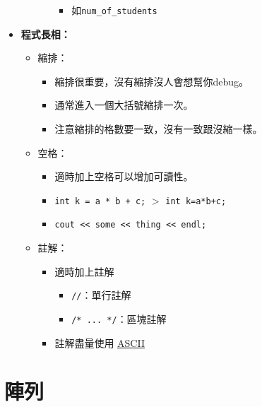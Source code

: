 \documentclass[a4paper, 11pt, oneside]{book}
\begin{document}
\begin{itemize}
\begin{itemize}
\begin{itemize}
\begin{itemize}
                                  \item 如\texttt{num\_of\_students}
                              \end{itemize}
                    \end{itemize}
          \end{itemize}
    \item \textbf{程式長相：}
          \begin{itemize}
              \item 縮排：
                    \begin{itemize}
                        \item 縮排很重要，沒有縮排沒人會想幫你debug。
                        \item 通常進入一個大括號縮排一次。
                        \item 注意縮排的格數要一致，沒有一致跟沒縮一樣。
                    \end{itemize}
              \item 空格：
                    \begin{itemize}
                        \item 適時加上空格可以增加可讀性。
                        \item \texttt{int k = a * b + c;} $>$ \texttt{int k=a*b+c;}
                        \item \texttt{cout << some << thing << endl;}
                    \end{itemize}
              \item 註解：
                    \begin{itemize}
                        \item 適時加上註解
                              \begin{itemize}
                                  \item \texttt{//}：單行註解
                                  \item \texttt{/* ... */}：區塊註解
                              \end{itemize}
                        \item 註解盡量使用 \href{https://zh.wikipedia.org/zh-tw/ASCII}{\underline{ASCII}}
                    \end{itemize}
          \end{itemize}
\end{itemize}

\chapter{陣列}
\end{document}
